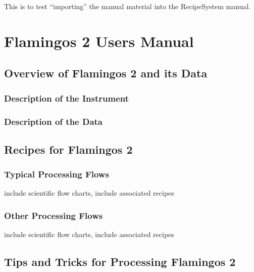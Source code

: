 \documentclass[letterpaper,10pt,english]{sphinxmanual}
\begin{document}
This is to test ``importing'' the  manual material into the RecipeSystem manual.


\chapter{Flamingos 2 Users Manual}
\label{F2contents::doc}\label{F2contents:f2-users-manual}\label{F2contents:flamingos-2-users-manual}

\section{Overview of Flamingos 2 and its Data}
\label{F2/instrument:f2-instrument-overview}\label{F2/instrument:overview-of-flamingos-2-and-its-data}\label{F2/instrument::doc}

\subsection{Description of the Instrument}
\label{F2/instrument:description-of-the-instrument}

\subsection{Description of the Data}
\label{F2/instrument:description-of-the-data}

\section{Recipes for Flamingos 2}
\label{F2/recipes:recipes-for-flamingos-2}\label{F2/recipes:f2-recipes-and-flows}\label{F2/recipes::doc}

\subsection{Typical Processing Flows}
\label{F2/recipes:typical-processing-flows}
include scientific flow charts, include associated recipes


\subsection{Other Processing Flows}
\label{F2/recipes:other-processing-flows}
include scientific flow charts, include associated recipes


\section{Tips and Tricks for Processing Flamingos 2}
\label{F2/tipstricks::doc}\label{F2/tipstricks:tips-and-tricks-for-processing-flamingos-2}\label{F2/tipstricks:f2-tips-tricks}
\end{document}
